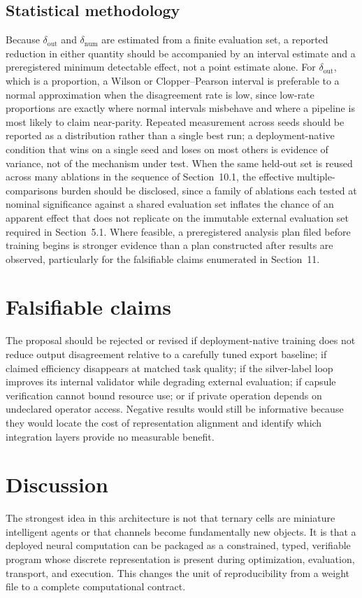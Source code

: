 \documentclass[11pt]{article}
\begin{document}
\subsection{Statistical methodology}
Because $\delta_{\text{out}}$ and $\delta_{\text{num}}$ are estimated from a finite evaluation set, a reported reduction in either quantity should be accompanied by an interval estimate and a preregistered minimum detectable effect, not a point estimate alone. For $\delta_{\text{out}}$, which is a proportion, a Wilson or Clopper--Pearson interval is preferable to a normal approximation when the disagreement rate is low, since low-rate proportions are exactly where normal intervals misbehave and where a pipeline is most likely to claim near-parity. Repeated measurement across seeds should be reported as a distribution rather than a single best run; a deployment-native condition that wins on a single seed and loses on most others is evidence of variance, not of the mechanism under test. When the same held-out set is reused across many ablations in the sequence of Section~10.1, the effective multiple-comparisons burden should be disclosed, since a family of ablations each tested at nominal significance against a shared evaluation set inflates the chance of an apparent effect that does not replicate on the immutable external evaluation set required in Section~5.1. Where feasible, a preregistered analysis plan filed before training begins is stronger evidence than a plan constructed after results are observed, particularly for the falsifiable claims enumerated in Section~11.

\section{Falsifiable claims}
The proposal should be rejected or revised if deployment-native training does not reduce output disagreement relative to a carefully tuned export baseline; if claimed efficiency disappears at matched task quality; if the silver-label loop improves its internal validator while degrading external evaluation; if capsule verification cannot bound resource use; or if private operation depends on undeclared operator access. Negative results would still be informative because they would locate the cost of representation alignment and identify which integration layers provide no measurable benefit.

\section{Discussion}
The strongest idea in this architecture is not that ternary cells are miniature intelligent agents or that channels become fundamentally new objects. It is that a deployed neural computation can be packaged as a constrained, typed, verifiable program whose discrete representation is present during optimization, evaluation, transport, and execution. This changes the unit of reproducibility from a weight file to a complete computational contract.
\end{document}
